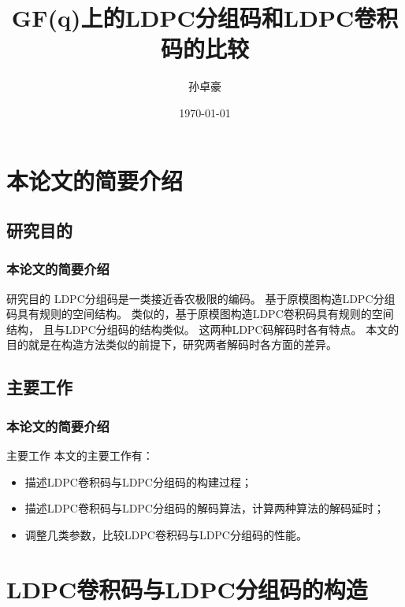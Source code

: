 \documentclass{beamer}
\title{GF(q)上的LDPC分组码和LDPC卷积码的比较}
\author{孙卓豪}
\institute{南开大学 \& 电子信息科学与技术}
\date{\today}
\begin{document}
\usetikzlibrary{shapes,snakes}
\usetikzlibrary{arrows, decorations.markings}
\begin{frame}
    \titlepage
\end{frame}

\begin{frame}[shrink]
    \tableofcontents
\end{frame}

\section{本论文的简要介绍}
\subsection{研究目的}
\begin{frame}
\frametitle{本论文的简要介绍}
    \begin{block}{研究目的}
    LDPC分组码是一类接近香农极限的编码。
    基于原模图构造LDPC分组码具有规则的空间结构。
    类似的，基于原模图构造LDPC卷积码具有规则的空间结构，
    且与LDPC分组码的结构类似。
    这两种LDPC码解码时各有特点。
    本文的目的就是在构造方法类似的前提下，研究两者解码时各方面的差异。
    \end{block}
\end{frame}

\subsection{主要工作}
\begin{frame}
\frametitle{本论文的简要介绍}
    \begin{block}{主要工作}
    本文的主要工作有：
    \begin{itemize}
        \item 描述LDPC卷积码与LDPC分组码的构建过程；
        \item 描述LDPC卷积码与LDPC分组码的解码算法，计算两种算法的解码延时；
        \item 调整几类参数，比较LDPC卷积码与LDPC分组码的性能。
    \end{itemize}
    \end{block}
\end{frame}


\section{LDPC卷积码与LDPC分组码的构造}
\end{document}
